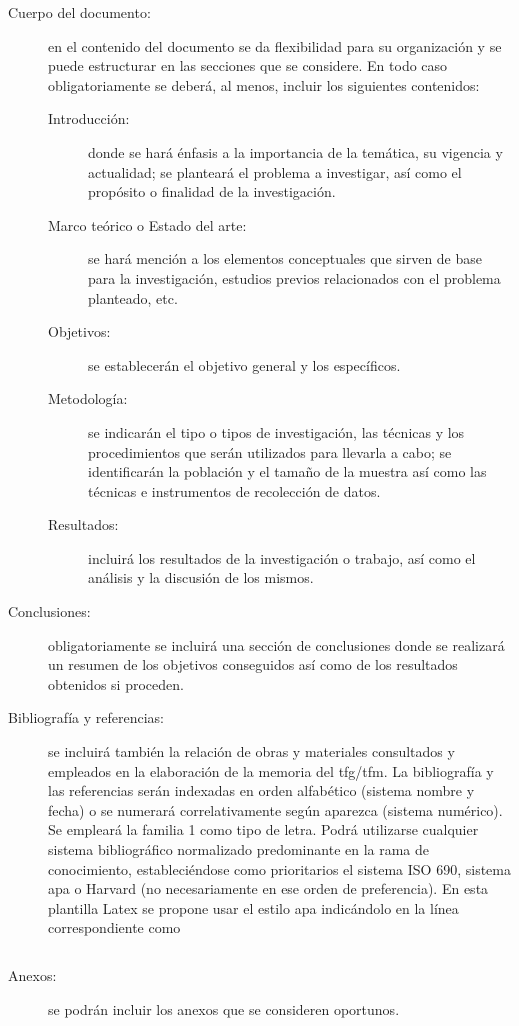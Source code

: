 \begin{description}
\begin{description}
\end{description}
\item[Cuerpo del documento:] en el contenido del documento se da flexibilidad para su organización y se puede estructurar en las secciones que se considere. En todo caso obligatoriamente se deberá, al menos, incluir los siguientes contenidos:
\begin{description}
\item[Introducción:] donde se hará énfasis a la importancia de la temática, su vigencia y actualidad; se planteará el problema a investigar, así como el propósito o finalidad de la investigación.
\item[Marco teórico o Estado del arte:] se hará mención a los elementos conceptuales que sirven de base para la investigación, estudios previos relacionados con el problema planteado, etc.
\item[Objetivos:] se establecerán el objetivo general y los específicos.
\item[Metodología:] se indicarán el tipo o tipos de investigación, las técnicas y los procedimientos que serán utilizados para llevarla a cabo; se identificarán la población y el tamaño de la muestra así como las técnicas e instrumentos de recolección de datos.
\item[Resultados:] incluirá los resultados de la investigación o trabajo, así como el análisis y la discusión de los mismos.
\end{description}
\item[Conclusiones:] obligatoriamente se incluirá una sección de conclusiones donde se realizará un resumen de los objetivos conseguidos así como de los resultados obtenidos si proceden.
\item[Bibliografía y referencias:] se incluirá también la relación de obras y materiales consultados y empleados en la elaboración de la memoria del \gls{tfg}/\gls{tfm}. La bibliografía y las referencias serán indexadas en orden alfabético (sistema nombre y fecha) o se numerará correlativamente según aparezca (sistema numérico). Se empleará la familia 1 como tipo de letra. Podrá utilizarse cualquier sistema bibliográfico normalizado predominante en la rama de conocimiento, estableciéndose como prioritarios el sistema ISO 690, sistema \gls{apa}  o Harvard (no necesariamente en ese orden de preferencia). En esta plantilla Latex se propone usar el estilo \gls{apa} indicándolo en la línea correspondiente como 
\begin{verbatim}

\end{verbatim}


\item[Anexos:] se podrán incluir los anexos que se consideren oportunos.

\end{description}

